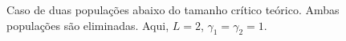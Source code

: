 \documentclass{article}
\begin{document}
	\begin{figure}[h]
		\centering
		\qquad
		\caption{Caso de duas populações abaixo do tamanho crítico teórico. Ambas populações são eliminadas. Aqui, $L = 2$, $\gamma_1 = \gamma_2 = 1$.}
		\label{fig:Two-P-16-Elimination-Area-Time}
	\end{figure}	
	
\end{document}

